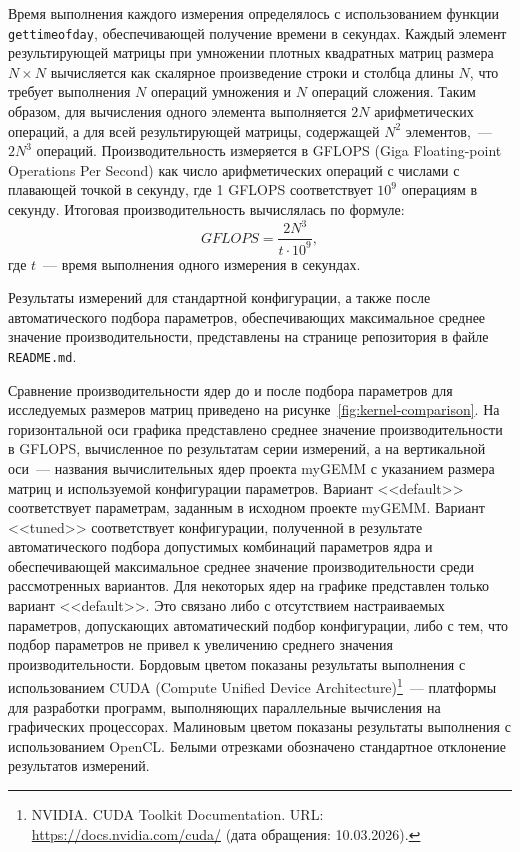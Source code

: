 \documentclass[a4paper]{article}
\begin{document}
Время выполнения каждого измерения определялось с использованием функции \texttt{gettimeofday}, обеспечивающей получение времени в секундах. Каждый элемент результирующей матрицы при умножении плотных квадратных матриц размера \(N \times N\) вычисляется как скалярное произведение строки и столбца длины \(N\), что требует выполнения \(N\) операций умножения и \(N\) операций сложения. Таким образом, для вычисления одного элемента выполняется \(2N\) арифметических операций, а для всей результирующей матрицы, содержащей \(N^2\) элементов,~--- \(2N^3\) операций. Производительность измеряется в GFLOPS (Giga Floating-point Operations Per Second) как число арифметических операций с числами с плавающей точкой в секунду, где 1 GFLOPS соответствует $10^9$ операциям в секунду. Итоговая производительность вычислялась по формуле:
\[
GFLOPS = \frac{2N^3}{t \cdot 10^9},
\]
где \(t\)~--- время выполнения одного измерения в секундах.

Результаты измерений для стандартной конфигурации, а также после автоматического подбора параметров, обеспечивающих максимальное среднее значение производительности, представлены на странице репозитория в файле \texttt{README.md}.

Сравнение производительности ядер до и после подбора параметров для исследуемых размеров матриц приведено на рисунке~\ref{fig:kernel-comparison}. На горизонтальной оси графика представлено среднее значение производительности в GFLOPS, вычисленное по результатам серии измерений, а на вертикальной оси~--- названия вычислительных ядер проекта myGEMM с указанием размера матриц и используемой конфигурации параметров. Вариант <<default>> соответствует параметрам, заданным в исходном проекте myGEMM. Вариант <<tuned>> соответствует конфигурации, полученной в результате автоматического подбора допустимых комбинаций параметров ядра и обеспечивающей максимальное среднее значение производительности среди рассмотренных вариантов. Для некоторых ядер на графике представлен только вариант <<default>>. Это связано либо с отсутствием настраиваемых параметров, допускающих автоматический подбор конфигурации, либо с тем, что подбор параметров не привел к увеличению среднего значения производительности. Бордовым цветом показаны результаты выполнения с использованием CUDA (Compute Unified Device Architecture)\footnote{NVIDIA. CUDA Toolkit Documentation. URL: \url{https://docs.nvidia.com/cuda/} (дата обращения: 10.03.2026).}~--- платформы для разработки программ, выполняющих параллельные вычисления на графических процессорах. Малиновым цветом показаны результаты выполнения с использованием OpenCL. Белыми отрезками обозначено стандартное отклонение результатов измерений.
\end{document}
